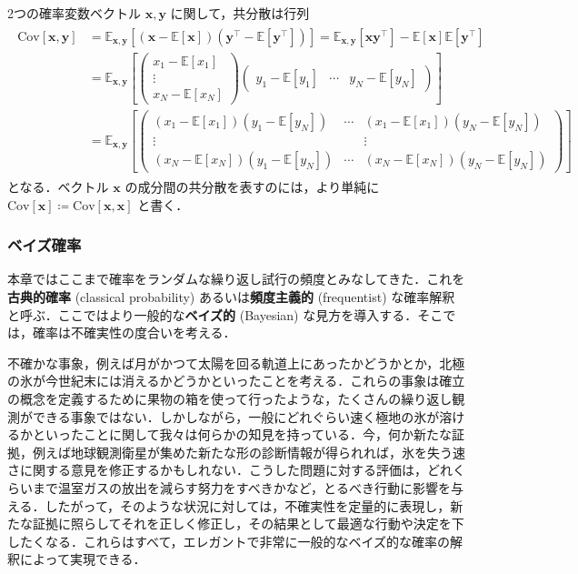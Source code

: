 \documentclass[uplatex,a4paper,oneside,openany,dvipdfmx]{jsarticle}
\numberwithin{equation}{section}
\theoremstyle{mystyle} %
\newcommand{\BE}{\mathbb{E}}
\newcommand{\tb}[1]{\textbf{#1}}
\newcommand{\bs}[1]{\boldsymbol{#1}}
\newcommand{\cov}[1]{\mathrm{Cov}[#1]}
\begin{document}
2つの確率変数ベクトル $\bs{x},\bs{y}$ に関して，共分散は行列
\begin{align} \label{eq:1.42}
    \begin{aligned}
        \cov{\bs{x},\bs{y}} &= \BE_{\bs{x},\bs{y}}[(\bs{x} - \BE[\bs{x}])(\bs{y}^{\top} - \BE[\bs{y}^{\top}])] = \BE_{\bs{x},\bs{y}}[\bs{x}\bs{y}^{\top}] - \BE[\bs{x}]\BE[\bs{y}^{\top}] \\
        &= \BE_{\bs{x},\bs{y}}\left[\begin{pmatrix}
        x_{1} - \BE[x_{1}] \\
        \vdots \\
        x_{N} - \BE[x_{N}]
        \end{pmatrix}\begin{pmatrix}
            y_{1} - \BE[y_{1}] & \cdots & y_{N} - \BE[y_{N}]
        \end{pmatrix}\right] \\
        &= \BE_{\bs{x},\bs{y}}\left[\begin{pmatrix}
            (x_{1} - \BE[x_{1}])(y_{1} - \BE[y_{N}]) & \cdots & (x_{1} - \BE[x_{1}])(y_{N} - \BE[y_{N}]) \\
            \vdots &  & \vdots \\
            (x_{N} - \BE[x_{N}])(y_{1} - \BE[y_{N}]) & \cdots & (x_{N} - \BE[x_{N}])(y_{N} - \BE[y_{N}])
        \end{pmatrix}\right]
    \end{aligned}
\end{align}
となる．ベクトル $\bs{x}$ の成分間の共分散を表すのには，より単純に $\cov{\bs{x}} \coloneqq \cov{\bs{x},\bs{x}}$ と書く．

\subsubsection{ベイズ確率}

本章ではここまで確率をランダムな繰り返し試行の頻度とみなしてきた．これを\tb{古典的確率} (classical probability) あるいは\tb{頻度主義的} (frequentist) な確率解釈と呼ぶ．ここではより一般的な\tb{ベイズ的} (Bayesian) な見方を導入する．そこでは，確率は不確実性の度合いを考える．

不確かな事象，例えば月がかつて太陽を回る軌道上にあったかどうかとか，北極の氷が今世紀末には消えるかどうかといったことを考える．これらの事象は確立の概念を定義するために果物の箱を使って行ったような，たくさんの繰り返し観測ができる事象ではない．しかしながら，一般にどれぐらい速く極地の氷が溶けるかといったことに関して我々は何らかの知見を持っている．今，何か新たな証拠，例えば地球観測衛星が集めた新たな形の診断情報が得られれば，氷を失う速さに関する意見を修正するかもしれない．こうした問題に対する評価は，どれくらいまで温室ガスの放出を減らす努力をすべきかなど，とるべき行動に影響を与える．したがって，そのような状況に対しては，不確実性を定量的に表現し，新たな証拠に照らしてそれを正しく修正し，その結果として最適な行動や決定を下したくなる．これらはすべて，エレガントで非常に一般的なベイズ的な確率の解釈によって実現できる．
\end{document}
